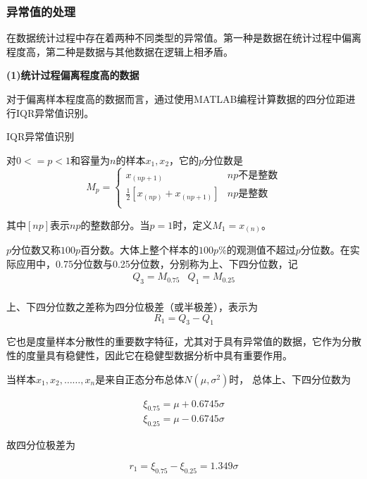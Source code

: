 \documentclass[UTF8]{ctexart}
\begin{document}
	\subsubsection{异常值的处理}
	在数据统计过程中存在着两种不同类型的异常值。第一种是数据在统计过程中偏离程度高，第二种是数据与其他数据在逻辑上相矛盾。 \par
	\textbf{(1)统计过程偏离程度高的数据}\par
	对于偏离样本程度高的数据而言，通过使用MATLAB编程计算数据的四分位距进行IQR异常值识别。 \par
	[1]IQR异常值识别\par
	对$0<=p<1$和容量为$n$的样本$x_1,x_2$，它的$p$分位数是 
	\begin{equation}
		M_p=\begin{cases}
			x_{(np+1)}&		np\text{不是整数}\\
			\frac{1}{2}\left[ x_{(np)}+x_{(np+1)} \right]&		np\text{是整数}\\
		\end{cases}
	\end{equation}\par
	其中$[np]$表示$np$的整数部分。当$p=1$时，定义$M_1=x_{\left( n \right)}$。 \par
	$p$分位数又称$100p$百分数。大体上整个样本的$100p\%$的观测值不超过$p$分位数。在实际应用中，0.75分位数与0.25分位数，分别称为上、下四分位数，记 
	$$
	\begin{matrix}
		Q_3=M_{0.75}&		Q_1=M_{0.25}\\
	\end{matrix}
	$$\par
	上、下四分位数之差称为四分位极差（或半极差），表示为 
	$$
	R_1=Q_3-Q_1
	$$\par
	它也是度量样本分散性的重要数字特征，尤其对于具有异常值的数据，它作为分散性的度量具有稳健性，因此它在稳健型数据分析中具有重要作用。 \par
	当样本$x_1,x_2,……,x_n$是来自正态分布总体$N\left( \mu ,\sigma ^2 \right) $时， 总体上、下四分位数为 \par
	\begin{equation}
		\begin{aligned}
			\xi _{0.75}=\mu +0.6745\sigma 
			\\
			\xi _{0.25}=\mu -0.6745\sigma
		\end{aligned}
	\end{equation}\par
	故四分位极差为 \par
	\begin{equation}
		r_1=\xi _{0.75}-\xi _{0.25}=1.349\sigma 
	\end{equation}\par
\end{document}
